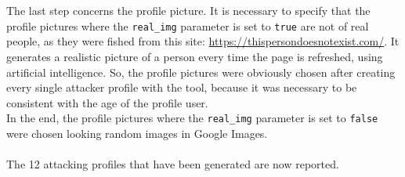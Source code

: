 \\\\The last step concerns the profile picture. It is necessary to specify that the profile pictures where the \texttt{real\_img} parameter is set to \texttt{true} are not of real people, as they were fished from this site: \url{https://thispersondoesnotexist.com/}. It generates a realistic picture of a person every time the page is refreshed, using artificial intelligence. So, the profile pictures were obviously chosen after creating every single attacker profile with the tool, because it was necessary to be consistent with the age of the profile user.
\\In the end, the profile pictures where the \texttt{real\_img} parameter is set to \texttt{false} were chosen looking random images in Google Images.
\\\\The 12 attacking profiles that have been generated are now reported.\\

